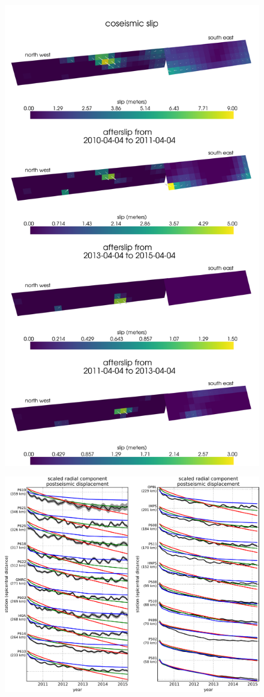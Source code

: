 \documentclass[1p]{elsarticle}
\begin{document}
\begin{figure}
\includegraphics[scale=0.09]{Figures/finalslip}
\centering 
\caption{}
\label{fig:FinalSlip}
\end{figure} 


\begin{figure}
\includegraphics[scale=0.6]{Figures/recordsection2}
\centering 
\caption{}
\label{fig:RecordSection2}
\end{figure} 
\end{document}
